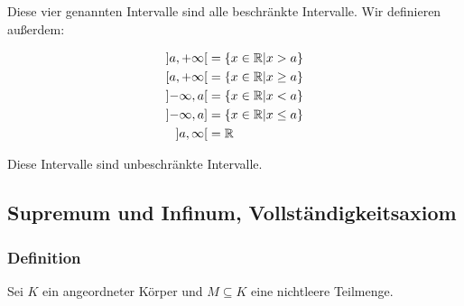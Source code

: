 \documentclass{article}
\begin{document}
Diese vier genannten Intervalle sind alle beschränkte Intervalle. Wir definieren außerdem:

\begin{align*}
\interval[open]{a}{+\infty}       &= \{ x \in \mathbb{R} | x > a \} \\
\interval[open right]{a}{+\infty} &= \{ x \in \mathbb{R} | x  \geq a \} \\
\interval[open]{-\infty}{a}       &= \{ x \in \mathbb{R} | x < a \} \\
\interval[open left]{-\infty}{a}  &= \{ x \in \mathbb{R} | x \leq a \} \\
\interval[open]{a}{\infty}        &= \mathbb{R} \\
\end{align*}

Diese Intervalle sind unbeschränkte Intervalle.

\subsection{Supremum und Infinum, Vollständigkeitsaxiom}

\subsubsection{Definition}
\label{sec:1.3.1}

Sei $K$ ein angeordneter Körper und $M \subseteq K$ eine nichtleere Teilmenge.
\end{document}
